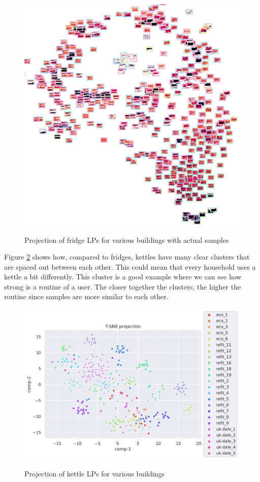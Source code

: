 \begin{figure}[H]
	\centering
	\caption{Projection of fridge LPs for various buildings with actual samples}
	\includegraphics[width=.9\textwidth]{Figures/TSNE/TSNE_per_appliance/all/img_scatter_allfridge_freeezer_fridge freezer.png}
	\label{fig:tsne_pa_img_scatter_all_fridge}
\end{figure}

Figure \ref{fig:tsne_pa_scatter_all_kettle} shows how,
compared to fridges, kettles have many clear clusters that are spaced out between each other. 
This could mean that every household uses a kettle a bit differently.
This cluster is a good example where we can see how strong is a routine of a user.
The closer together the clusters, the higher the routine since samples are more similar to each other.

\begin{figure}[H]
	\centering
	\caption{Projection of kettle LPs for various buildings}
	\includegraphics[width=1.2\textwidth]{Figures/TSNE/TSNE_per_appliance/all/scatter_all_kettle.png}
	\label{fig:tsne_pa_scatter_all_kettle}
\end{figure}


